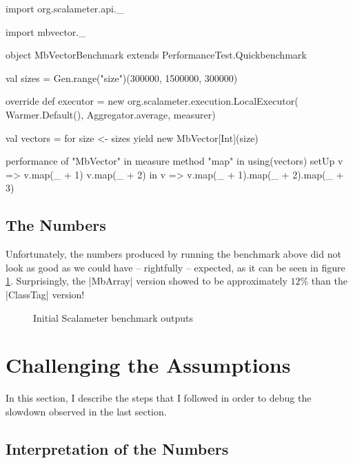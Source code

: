 \begin{lstlisting-nobreak}
import org.scalameter.api._

import mbvector._

object MbVectorBenchmark extends PerformanceTest.Quickbenchmark {
  val sizes = Gen.range("size")(300000, 1500000, 300000)

  override def executor = new org.scalameter.execution.LocalExecutor(
    Warmer.Default(),
    Aggregator.average,
    measurer)

  val vectors = for {
    size <- sizes
  } yield new MbVector[Int](size)

  performance of "MbVector" in {
    measure method "map" in {
      using(vectors) setUp {
        v => 
          v.map(_ + 1)
          v.map(_ + 2)
      } in {
        v => v.map(_ + 1).map(_ + 2).map(_ + 3)
      }
    }
  }
}
\end{lstlisting-nobreak}

\subsection{The Numbers}

Unfortunately, the numbers produced by running the benchmark above did not look as good as we could have -- rightfully -- expected, as it can be seen in figure \ref{fig:InitCTvsMB}.
Surprisingly, the |MbArray| version showed to be approximately $12\%$ than the |ClassTag| version!

\begin{figure}
\centering
{}
\caption{Initial Scalameter benchmark outputs}\label{fig:BenchOuts}
\label{fig:InitCTvsMB}
\end{figure} 

\section{Challenging the Assumptions}

In this section, I describe the steps that I followed in order to debug the slowdown observed in the last section.

\subsection{Interpretation of the Numbers}

